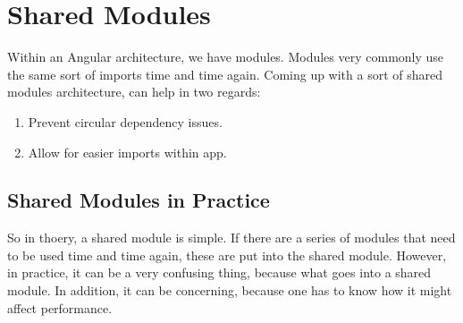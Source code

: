\chapter{ Shared Modules }
Within an Angular architecture, we have modules. Modules very commonly use the same 
sort of imports time and time again. Coming up with a sort of shared modules 
architecture, can help in two regards: 

\begin{enumerate}
  \item Prevent circular dependency issues.
  \item Allow for easier imports within app.
\end{enumerate}

\section{Shared Modules in Practice}
So in thoery, a shared module is simple. If there are a series of modules that
need to be used time and time again, these are put into the shared module. However,
in practice, it can be a very confusing thing, because what goes into a shared module. 
In addition, it can be concerning, because one has to know how it might affect 
performance. 